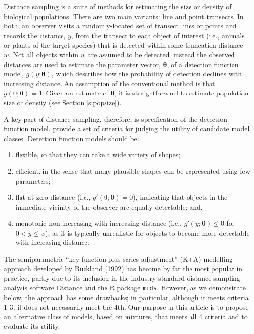 \documentclass[authoryear,preprint,review,12pt]{elsarticle}
\begin{document}
Distance sampling \citep{Buckland:2001vm,Buckland:2004ts} is a suite of methods for estimating the size or density of biological populations.  There are two main variants: line and point transects. In both, an observer visits a randomly-located set of transect lines or points and records the distance, $y$, from the transect to each object of interest (i.e., animals or plants of the target species) that is detected within some truncation distance $w$.  Not all objects within $w$ are assumed to be detected; instead the observed distances are used to estimate the parameter vector, $\bm{\theta}$, of a detection function model, $g(y;\bm{\theta})$, which describes how the probability of detection declines with increasing distance.  An assumption of the conventional method is that $g(0;\bm{\theta})=1$. Given an estimate of $\bm{\theta}$, it is straightforward to estimate population size or density (see Section \ref{s:popsize}).

A key part of distance sampling, therefore, is specification of the detection function model.  \citet[][Chapter 2]{Buckland:2001vm} provide a set of criteria for judging the utility of candidate model classes. Detection function models should be:
\begin{enumerate}
\item flexible, so that they can take a wide variety of shapes;
\item efficient, in the sense that many plausible shapes can be represented using few parameters;
\item flat at zero distance (i.e., $g'(0;\bm{\theta})=0$), indicating that objects in the immediate vicinity of the observer are equally detectable; and,
\item monotonic non-increasing with increasing distance (i.e., $g'(y;\bm{\theta}) \leq 0$ for $0<y\leq w$), as it is typically unrealistic for objects to become more detectable with increasing distance.
\end{enumerate}
The semiparametric ``key function plus series adjustment'' (K+A) modelling approach developed by Buckland (1992) has become by far the most popular in practice, partly due to its inclusion in the industry-standard distance sampling analysis software Distance \citep{Thomas:2010cf} and the \textsf{R} package \texttt{mrds}.  However, as we demonstrate below, the approach has some drawbacks; in particular, although it meets criteria 1-3, it does not necessarily meet the 4th.  Our purpose in this article is to propose an alternative class of models, based on mixtures, that meets all 4 criteria and to evaluate its utility.  
\end{document}
